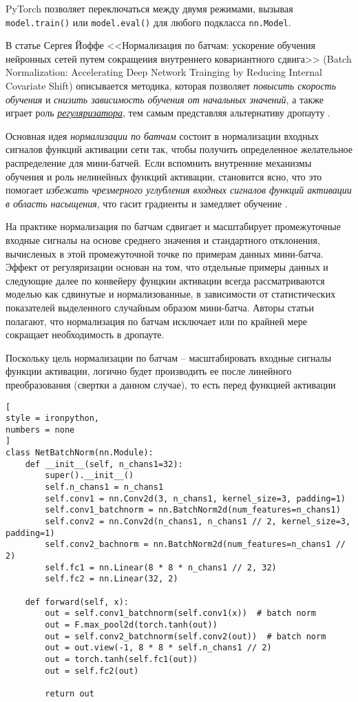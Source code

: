 \documentclass[%
	11pt,
	a4paper,
	utf8,
		]{article}
\begin{document}
PyTorch позволяет переключаться между двумя режимами, вызывая \verb|model.train()| или \verb|model.eval()| для любого подкласса \verb|nn.Model|.

В статье Сергея Йоффе <<Нормализация по батчам: ускорение обучения нейронных сетей путем сокращения внутреннего ковариантного сдвига>> (Batch Normalization: Accelerating Deep Network Trainging by Reducing Internal Covariate Shift) описывается методика, которая позволяет \emph{повысить скорость обучения} и \emph{снизить зависимость обучения от начальных значений}, а также играет роль \underline{\itshape регуляризатора}, тем самым представляя альтернативу дропауту \cite[]{pytorch-2022}.

Основная идея \emph{нормализации по батчам} состоит в нормализации входных сигналов функций активации сети так, чтобы получить определенное желательное распределение для мини-батчей. Если вспомнить внутренние механизмы обучения и роль нелинейных функций активации, становится ясно, что это помогает \emph{избежать чрезмерного углубления входных сигналов функций активации в область насыщения}, что гасит градиенты и замедляет обучение \cite[]{pytorch-2022}.

На практике нормализация по батчам сдвигает и масштабирует промежуточные входные сигналы на основе среднего значения и стандартного отклонения, вычисленых в этой промежуточной точке по примерам данных мини-батча. Эффект от регуляризации основан на том, что отдельные примеры данных и следующие далее по конвейеру фунцкии активации всегда рассматриваются моделью как сдвинутые и нормализованные, в зависимости от статистических показателей выделенного случайным образом мини-батча. Авторы статьи полагают, что нормализация по батчам исключает или по крайней мере сокращает необходимость в дропауте.

Поскольку цель нормализации по батчам -- масштабировать входные сигналы функции активации, логично будет производить ее после линейного преобразования (свертки а данном случае), то есть перед функцией активации
\begin{lstlisting}[
style = ironpython,
numbers = none	
]
class NetBatchNorm(nn.Module):
    def __init__(self, n_chans1=32):
        super().__init__()
        self.n_chans1 = n_chans1
        self.conv1 = nn.Conv2d(3, n_chans1, kernel_size=3, padding=1)
        self.conv1_batchnorm = nn.BatchNorm2d(num_features=n_chans1)
        self.conv2 = nn.Conv2d(n_chans1, n_chans1 // 2, kernel_size=3, padding=1)
        self.conv2_bachnorm = nn.BatchNorm2d(num_features=n_chans1 // 2)
        self.fc1 = nn.Linear(8 * 8 * n_chans1 // 2, 32)
        self.fc2 = nn.Linear(32, 2)
        
    def forward(self, x):
        out = self.conv1_batchnorm(self.conv1(x))  # batch norm
        out = F.max_pool2d(torch.tanh(out))
        out = self.conv2_batchnorm(self.conv2(out))  # batch norm
        out = out.view(-1, 8 * 8 * self.n_chans1 // 2)
        out = torch.tanh(self.fc1(out))
        out = self.fc2(out)
        
        return out
\end{lstlisting}
\end{document}
